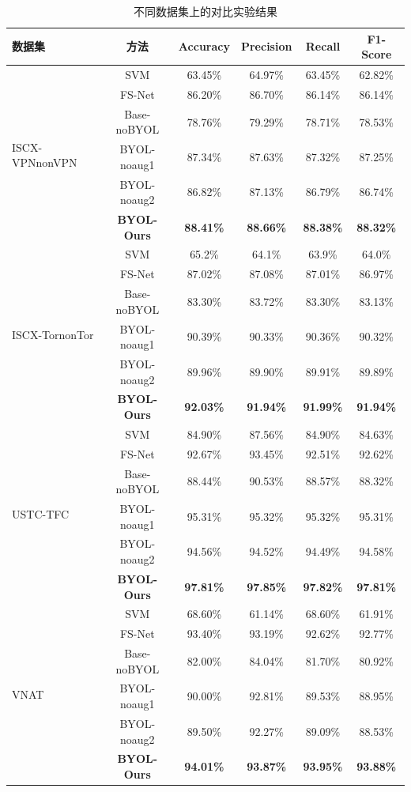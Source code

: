 \begin{table}[htbp]
\centering
\renewcommand{\arraystretch}{1.3}
\caption{不同数据集上的对比实验结果}
\label{tab:comparisonA}
\begin{tabular}{lccccc}
\toprule
\textbf{数据集} & \textbf{方法} & \textbf{Accuracy} & \textbf{Precision} & \textbf{Recall} & \textbf{F1-Score} \\ \midrule
\multirow{6}{*}{ISCX-VPNnonVPN} 
 & SVM & 63.45\% & 64.97\% & 63.45\% & 62.82\% \\
 & FS-Net & 86.20\% & 86.70\% & 86.14\% & 86.14\% \\
 & Base-noBYOL & 78.76\% & 79.29\% & 78.71\% & 78.53\% \\
 & BYOL-noaug1 & 87.34\% & 87.63\% & 87.32\% & 87.25\% \\
 & BYOL-noaug2 & 86.82\% & 87.13\% & 86.79\% & 86.74\% \\
 & \textbf{BYOL-Ours} & \textbf{88.41\%} & \textbf{88.66\%} & \textbf{88.38\%} & \textbf{88.32\%} \\ \midrule
\multirow{6}{*}{ISCX-TornonTor} 
 & SVM & 65.2\% & 64.1\% & 63.9\% & 64.0\% \\
 & FS-Net & 87.02\% & 87.08\% & 87.01\% & 86.97\% \\
 & Base-noBYOL & 83.30\% & 83.72\% & 83.30\% & 83.13\% \\
 & BYOL-noaug1 & 90.39\% & 90.33\% & 90.36\% & 90.32\% \\
 & BYOL-noaug2 & 89.96\% & 89.90\% & 89.91\% & 89.89\% \\
 & \textbf{BYOL-Ours} & \textbf{92.03\%} & \textbf{91.94\%} & \textbf{91.99\%} & \textbf{91.94\%} \\ \midrule
\multirow{6}{*}{USTC-TFC} 
 & SVM & 84.90\% & 87.56\% & 84.90\% & 84.63\% \\
 & FS-Net & 92.67\% & 93.45\% & 92.51\% & 92.62\% \\
 & Base-noBYOL & 88.44\% & 90.53\% & 88.57\% & 88.32\% \\
 & BYOL-noaug1 & 95.31\% & 95.32\% & 95.32\% & 95.31\% \\
 & BYOL-noaug2 & 94.56\% & 94.52\% & 94.49\% & 94.58\% \\
 & \textbf{BYOL-Ours} & \textbf{97.81\%} & \textbf{97.85\%} & \textbf{97.82\%} & \textbf{97.81\%} \\ \midrule
\multirow{6}{*}{VNAT} 
 & SVM & 68.60\% & 61.14\% & 68.60\% & 61.91\% \\
 & FS-Net & 93.40\% & 93.19\% & 92.62\% & 92.77\% \\
 & Base-noBYOL & 82.00\% & 84.04\% & 81.70\% & 80.92\% \\
 & BYOL-noaug1 & 90.00\% & 92.81\% & 89.53\% & 88.95\% \\
 & BYOL-noaug2 & 89.50\% & 92.27\% & 89.09\% & 88.53\% \\
 & \textbf{BYOL-Ours} & \textbf{94.01\%} & \textbf{93.87\%} & \textbf{93.95\%} & \textbf{93.88\%} \\ \bottomrule
\end{tabular}
\end{table}

